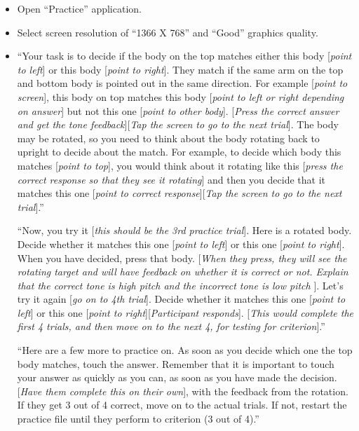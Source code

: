 \documentclass[idxtotoc,hyperref,openany]{labbook} %
\begin{document}
\begin{itemize}

\item Open ``Practice'' application.

\item Select screen resolution of ``1366 X 768'' and ``Good'' graphics quality.

\item ``Your task is to decide if the body on the top matches either this body [\emph{point to left}] or this body [\emph{point to right}]. They match if the same arm on the top and bottom body is pointed out in the same direction. For example [\emph{point to screen}], this body on top matches this body [\emph{point to left or right depending on answer}] but not this one [\emph{point to other body}].  [\emph{Press the correct answer and get the tone feedback}][\emph{Tap the screen to go to the next trial}]. The body may be rotated, so you need to think about the body rotating back to upright to decide about the match. For example, to decide which body this matches [\emph{point to top}], you would think about it rotating like this [\emph{press the correct response so that they see it rotating}] and then you decide that it matches this one [\emph{point to correct response}][\emph{Tap the screen to go to the next trial}].''

``Now, you try it [\emph{this should be the 3rd practice trial}]. Here is a rotated body. Decide whether it matches this one [\emph{point to left}] or this one [\emph{point to right}]. When you have decided, press that body. [\emph{When they press, they will see the rotating target and will have feedback on whether it is correct or not. Explain that the correct tone is high pitch and the incorrect tone is low pitch }]. Let’s try it again [\emph{go on to 4th trial}]. Decide whether it matches this one [\emph{point to left}] or this one [\emph{point to right}][\emph{Participant responds}]. [\emph{This would complete the first 4 trials, and then move on to the next 4, for testing for criterion}].''

``Here are a few more to practice on. As soon as you decide which one the top body matches, touch the answer. Remember that it is important to touch your answer as quickly as you can, as soon as you have made the decision. [\emph{Have them complete this on their own}], with the feedback from the rotation. If they get 3 out of 4 correct, move on to the actual trials. If not, restart the practice file until they perform to criterion (3 out of 4).''


\end{itemize}
\end{document}
